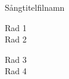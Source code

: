 \begin{song}{Sångtitel}{filnamn}
\begin{vers}
Rad 1\\
Rad 2\\
\end{vers}
\begin{vers}
Rad 3\\
Rad 4\\
\end{vers}
\end{song}

